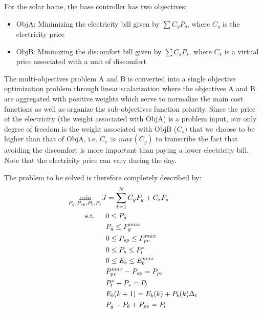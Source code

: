 \documentclass[conference]{IEEEtran}
\begin{document}
For the solar home, the base controller has two objectives:
\begin{itemize}
    \item ObjA: Minimizing the electricity bill given by $\sum C_gP_g$, where $C_g$ is the electricity price
    \item ObjB: Minimizing the  discomfort bill given by $\sum C_sP_s$, where $C_s$ is a virtual price associated with a unit of discomfort
\end{itemize}
The multi-objectives problem A and B is converted into a single objective optimization problem through linear scalarization \cite{Deb2014} where the objectives A and B are aggregated with positive weights which serve to normalize the main cost functions as well as organize the sub-objectives function
priority. Since the price of the electricity (the weight associated with ObjA) is a problem input, our only degree of freedom is the weight associated with ObjB ($C_s)$ that we choose to be higher than that of ObjA, i.e. $C_s \gg max(C_g)$ to transcribe the fact that avoiding the discomfort is more important than paying a lower electricity bill. Note that the electricity price can vary during the day.

The problem to be solved is therefore completely  described by:
\begin{subequations}
    \begin{align} 
        & \underset{P_g,P_{sp},P_b,P_s}{\text{min}} J = \sum_{k=1}^{N} C_gP_g + C_sP_s \label{eq:cost2min}\\
        & \text{\hspace{20px} s.t.\hspace{15px}} 0 \leq P_g \label{eq:Pgr_cons1} \\
        & \hspace{52px} P_g\leq P_g^{max} \label{eq:Pgr_cons2}\\
        & \hspace{52px} 0 \leq P_{sp} \leq P_{pv}^{max} \label{eq:Pcu_cons}\\
        & \hspace{52px} 0 \leq P_s \leq P_l^* \label{eq:Psh_cons} \\
        & \hspace{52px} 0 \leq E_b \leq E_b^{max} \label{eq:Est_cons} \\
        & \hspace{52px} P_{pv}^{max}-P_{sp} = P_{pv} \label{eq:P_pv} \\
        & \hspace{52px} P_l^* - P_s =  P_l\label{eq:P_l} \\
        & \hspace{52px} E_b(k+1) = E_b(k) + P_b(k)\Delta_t \label{eq:Est_dyn}  \\
        & \hspace{52px} P_g- P_b + {P_{pv}} = P_l \label{eq:Engy_csvt} 
    \end{align}
\end{subequations}
\end{document}
